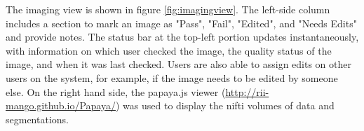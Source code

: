 The imaging view is shown in figure \ref{fig:imagingview}. The left-side column includes a section to mark an image as "Pass", "Fail", "Edited", and "Needs Edits" and provide notes. The status bar at the top-left portion updates instantaneously, with information on which user checked the image, the quality status of the image, and when it was last checked. Users are also able to assign edits on other users on the system, for example, if the image needs to be edited by someone else. On the right hand side, the papaya.js viewer (\href{http://rii-mango.github.io/Papaya/}{http://rii-mango.github.io/Papaya/}) was used to display the nifti volumes of data and segmentations.
